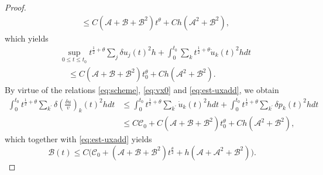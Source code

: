 \documentclass[a4paper,oneside,11pt]{article}
\numberwithin{equation}{section}
\begin{document}
\begin{proof}
\begin{equation}
\begin{aligned}
&\leq C(\mathscr{A}+\mathscr{B}+\mathscr{B}^2)t^{\theta}+C h(\mathscr{A}^2+\mathscr{B}^2),
\end{aligned}\end{equation}
which yields
\begin{equation}\label{eq:est-uxadd}\begin{aligned}
&\sup_{0\leq t\leq t_{0}}t^{\frac{1}{2}+\theta}\sum_{j}\delta u_{j}(t)^{2}h+\int_{0}^{t_0}\sum_{k}t^{\frac{1}{2}+\theta}\dot{u}_{k}(t)^{2}hdt\\
&\quad\leq C(\mathscr{A}+\mathscr{B}+\mathscr{B}^2)t_0^{\theta}+C h(\mathscr{A}^2+\mathscr{B}^2).
\end{aligned}\end{equation}
By virtue of the relations \eqref{eq:scheme},  \eqref{eq:vx0} and \eqref{eq:est-uxadd}, we obtain
\begin{equation*}
	\begin{aligned}
\int_{0}^{t_{0}}t^{\frac12+\theta}\sum\limits_{k^{\prime}}\delta\left(\frac{\delta u}{v}\right)_{k}(t)^{2}hdt&\leq \int_{0}^{t_{0}}t^{\frac12+\theta}\sum_{k^{\prime}}\dot{u}_{k}(t)^{2}hdt+\int_{0}^{t_{0}}t^{\frac12+\theta}\sum_{k^{\prime}}\delta p_{k}(t)^{2}hdt \\
&\leq C\mathscr{C}_0+C(\mathscr{A}+\mathscr{B}+\mathscr{B}^2)t_0^{\theta}+C h(\mathscr{A}^2+\mathscr{B}^2),
\end{aligned}
\end{equation*}
which together with \eqref{eq:est-uxadd} yields 
\begin{equation}\label{prop-ab}\mathscr{B}(t)\leq C\big(\mathscr{C}_0+(\mathscr{A}+\mathscr{B}+\mathscr{B}^2)t^{\frac{\theta}{2}}+ h(\mathscr{A}+\mathscr{A}^2+\mathscr{B}^2)\big).\end{equation}



\end{proof}
\end{document}
